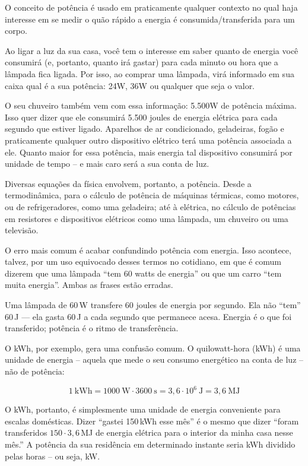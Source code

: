 
O conceito de potência é usado em praticamente qualquer contexto no qual haja interesse em se medir o quão rápido a energia é consumida/transferida para um corpo.

Ao ligar a luz da sua casa, você tem o interesse em saber quanto de energia você consumirá (e, portanto, quanto irá gastar) para cada minuto ou hora que a lâmpada fica ligada. Por isso, ao comprar uma lâmpada, virá informado em sua caixa qual é a sua potência: 24W, 36W ou qualquer que seja o valor.

O seu chuveiro também vem com essa informação: 5.500W de potência máxima. Isso quer dizer que ele consumirá 5.500 joules de energia elétrica para cada segundo que estiver ligado. Aparelhos de ar condicionado, geladeiras, fogão e praticamente qualquer outro dispositivo elétrico terá uma potência associada a ele. Quanto maior for essa potência, mais energia tal dispositivo consumirá por unidade de tempo -- e mais caro será a sua conta de luz.

Diversas equações da física envolvem, portanto, a potência. Desde a termodinâmica, para o cálculo de potência de máquinas térmicas, como motores, ou de refrigeradores, como uma geladeira; até à elétrica, no cálculo de potências em resistores e dispositivos elétricos como uma lâmpada, um chuveiro ou uma televisão.


O erro mais comum é acabar confundindo potência com energia. Isso acontece, talvez, por um uso equivocado desses termos no cotidiano, em que é comum dizerem que uma lâmpada ``tem 60 watts de energia'' ou que um carro ``tem muita energia''. Ambas as frases estão erradas.

Uma lâmpada de 60\,W transfere 60 joules de energia por segundo. Ela não ``tem'' 60\,J —
ela gasta 60\,J a cada segundo que permanece acesa. Energia é o que foi transferido;
potência é o ritmo de transferência.




O kWh, por exemplo, gera uma confusão comum. O  quilowatt-hora (kWh) é uma unidade de energia -- aquela que mede o seu consumo energético na conta de luz -- não de potência:

\[
1\ \text{kWh} = 1000\ \text{W} \cdot 3600\ \text{s} = 3{,}6 \cdot 10^{6}\ \text{J} = 3{,}6\ \text{MJ}
\]

O kWh, portanto, é simplesmente uma unidade de energia conveniente para escalas domésticas. Dizer ``gastei 150\,kWh esse mês'' é o mesmo que dizer ``foram transferidos $150 \cdot 3{,}6$\,MJ de energia elétrica para o interior da minha casa nesse mês.'' A potência da sua residência
em determinado instante seria kWh dividido pelas horas -- ou seja, kW.

